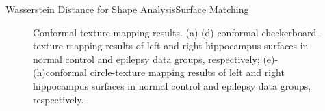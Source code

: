 \documentclass{beamer}
\theoremstyle{definition}
\begin{document}
\begin{frame}{Wasserstein Distance for Shape Analysis\cite{su2015optimal}}{Surface Matching}
\begin{figure}
\centering
{}
\caption{Conformal texture-mapping results. (a)-(d) conformal checkerboard-texture mapping results of left and right hippocampus
surfaces in normal control and epilepsy data groups, respectively; (e)-(h)conformal circle-texture mapping results of left and right hippocampus
surfaces in normal control and epilepsy data groups, respectively.}
\label{fig:textures}
\end{figure}
\end{frame}
\end{document}

